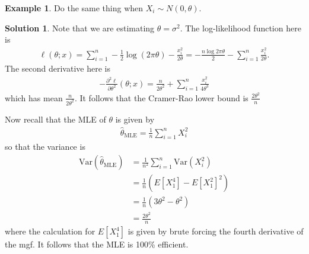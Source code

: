 \documentclass[11pt]{amsart}
\theoremstyle{definition}
\newtheorem{example}[theorem]{Example}
\newtheorem{solution}[theorem]{Solution}
\numberwithin{equation}{section}
\begin{document}
\begin{example}
    Do the same thing when $X_i\sim N(0,\theta)$.
\end{example}
\addtocounter{theorem}{-1}
\begin{solution}
    Note that we are estimating $\theta=\sigma^2$. The log-likelihood function here is 
    \begin{align*}
        \ell(\theta;x)=\sum_{i=1}^n-\frac{1}{2}\log(2\pi\theta)-\frac{x_i^2}{2\theta}=-\frac{n\log 2\pi\theta}{2}-\sum_{i=1}^n\frac{x_i^2}{2\theta}.
    \end{align*}
    The second derivative here is
    \begin{align*}
        -\frac{\partial^2\ell}{\partial\theta^2}(\theta;x)=\frac{n}{2\theta^2}+\sum_{i=1}^n\frac{x_i^2}{4\theta^3}
    \end{align*}
    which has mean $\frac{n}{2\theta^2}$. It follows that the Cramer-Rao lower bound is $\frac{2\theta^2}{n}$
    
    Now recall that the MLE of $\theta$ is given by
    \begin{align*}
        \hat\theta_{\mathrm{MLE}}=\frac{1}{n}\sum_{i=1}^nX_i^2
    \end{align*}
    so that the variance is
    \begin{align*}
        \mathrm{Var}(\hat\theta_{\mathrm{MLE}})&=\frac{1}{n^2}\sum_{i=1}^n\mathrm{Var}(X_i^2)\\
        &=\frac{1}{n}(E[X_1^4]-E[X_1^2]^2)\\
        &=\frac{1}{n}(3\theta^2-\theta^2)\\
        &=\frac{2\theta^2}{n}
    \end{align*}
    where the calculation for $E[X_1^4]$ is given by brute forcing the fourth derivative of the mgf. It follows that the MLE is 100\% efficient.
\end{solution}
\end{document}
